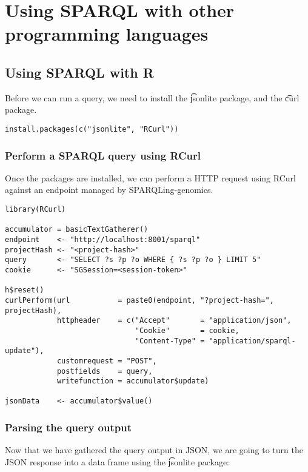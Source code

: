 \chapter{Using SPARQL with other programming languages}
\label{chap:programming}

\section{Using SPARQL with R}

  Before we can run a query, we need to install the \t{jsonlite} package,
  and the \t{curl} package.

\begin{siderules}
\begin{verbatim}
install.packages(c("jsonlite", "RCurl"))
\end{verbatim}
\end{siderules}

\subsection{Perform a SPARQL query using RCurl}

  Once the packages are installed, we can perform a HTTP request using RCurl
  against an endpoint managed by SPARQLing-genomics.

\begin{siderules}
\begin{verbatim}
library(RCurl)

accumulator = basicTextGatherer()
endpoint    <- "http://localhost:8001/sparql"
projectHash <- "<project-hash>"
query       <- "SELECT ?s ?p ?o WHERE { ?s ?p ?o } LIMIT 5"
cookie      <- "SGSession=<session-token>"

h$reset()
curlPerform(url           = paste0(endpoint, "?project-hash=", projectHash),
            httpheader    = c("Accept"       = "application/json",
                              "Cookie"       = cookie,
                              "Content-Type" = "application/sparql-update"),
            customrequest = "POST",
            postfields    = query,
            writefunction = accumulator$update)

jsonData    <- accumulator$value()
\end{verbatim}
\end{siderules}

\subsection{Parsing the query output}
  Now that we have gathered the query output in JSON, we are going to turn
  the JSON response into a data frame using the \t{jsonlite} package:

